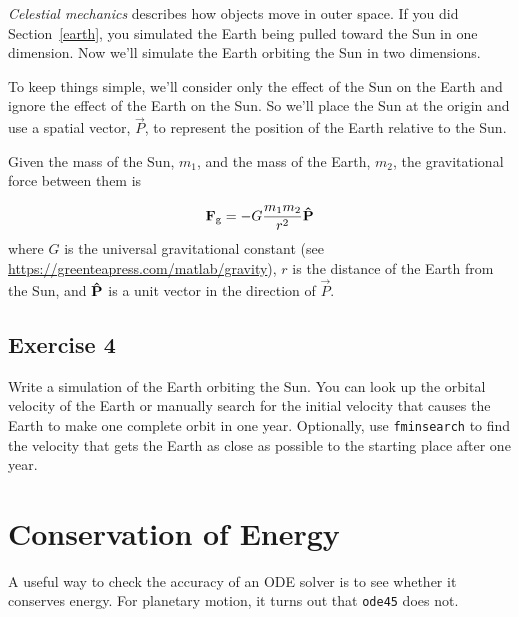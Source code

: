 
\emph{Celestial mechanics} describes how objects move in outer space.
If you did \linebreak Section~\ref{earth}, you simulated the Earth being pulled toward the Sun in one dimension.  Now we'll simulate the Earth orbiting the Sun in two dimensions.


To keep things simple, we'll consider only the effect of the Sun on the Earth and ignore the effect of the Earth on the Sun.  So we'll place the Sun at the origin and use a spatial vector, $\vec{P}$, to represent the position of the Earth relative to the Sun.


Given the mass of the Sun, $m_{1}$, and the mass of the Earth, $m_{2}$, the gravitational force between them is

\begin{equation*}
\vec{F}_\mathrm{g} = -G \frac{m_1 m_2}{r^2} \uvec{P}
\end{equation*}
where $G$ is the universal gravitational constant (see \url{https://greenteapress.com/matlab/gravity}),
$r$ is the distance of the Earth from the Sun, and
$\uvec{P}$ is a unit vector in the direction of $\vec{P}$.


\subsection{Exercise 4}
Write a simulation of the Earth orbiting the Sun.  You can look up the orbital velocity of the Earth or manually search for the initial velocity that causes the Earth to make one complete orbit in one year.  Optionally, use \lstinline{fminsearch} to find the velocity that gets the Earth as close as possible to the starting place after one year.



\section{Conservation of Energy}

A useful way to check the accuracy of an ODE solver is to see whether it conserves energy.  For planetary motion, it turns out that \lstinline{ode45} does not.

